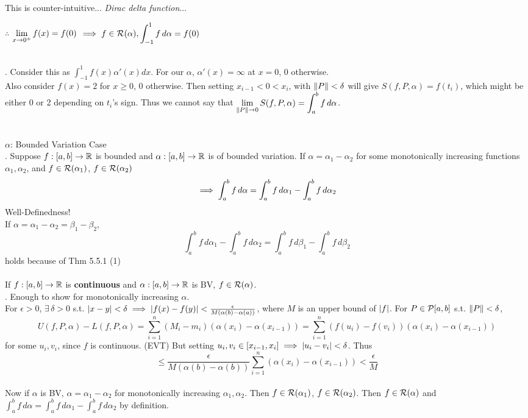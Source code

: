 This is counter-intuitive... \textit{Dirac delta function}...
\begin{center}
	$\therefore$ $\displaystyle\lim_{x\rightarrow0^{+}} f(x) = f(0)$ $\displaystyle \implies f\in \mathcal{R}(\alpha), \int_{-1}^1 f\,d\alpha = f(0)$
\end{center}~\\
\rmk. Consider this as $\int_{-1}^1 f(x)\alpha'(x) dx$. For our $\alpha$, $\alpha'(x) = \infty$ at $x=0$, 0 otherwise.\\
Also consider $f(x) = 2$ for $x\geq 0$, 0 otherwise. Then setting $x_{i-1} < 0 < x_{i}$, with $\left\lVert P\right\rVert < \delta$ will give $S(f, P, \alpha) = f(t_i)$, which might be either 0 or 2 depending on $t_i$'s sign. Thus we cannot say that $\displaystyle \lim_{\left\lVert P\right\rVert\rightarrow0} S(f, P, \alpha) = \int_a^b f\,d\alpha$.\\
\\
\\
$\alpha$: Bounded Variation Case\\
. Suppose $f:[a, b]\rightarrow\mathbb{R}$ is bounded and $\alpha:[a, b]\rightarrow\mathbb{R}$ is of bounded variation. If $\alpha = \alpha_1-\alpha_2$ for some monotonically increasing functions $\alpha_1, \alpha_2$, and $f\in \mathcal{R}(\alpha_1)$, $f\in \mathcal{R}(\alpha_2)$
$$\implies \int_a^b f\, d\alpha = \int_a^b f\,d\alpha_1 - \int_a^b f\,d\alpha_2$$
Well-Definedness!\\
If $\alpha = \alpha_1-\alpha_2 = \beta_1-\beta_2$,
$$\int_a^b f\,d\alpha_1 - \int_a^b f\,d\alpha_2 = \int_a^b f\,d\beta_1 - \int_a^b f\,d\beta_2$$
holds because of Thm 5.5.1 (1)\\
\\
 If $f:[a, b]\rightarrow\mathbb{R}$ is \textbf{continuous} and $\alpha:[a, b]\rightarrow\mathbb{R}$ is BV, $f\in \mathcal{R}(\alpha)$.\\
\pf. Enough to show for monotonically increasing $\alpha$.\\
For $\epsilon > 0$, $\exists\,\delta>0$ s.t. $\left|x-y\right|<\delta \implies \left|f(x)-f(y)\right| <\frac{\epsilon}{M (\alpha(b)-\alpha(a))}$,
where $M$ is an upper bound of $\left|f\right|$. For $P\in \mathcal{P}[a, b]$ s.t. $\left\lVert P\right\rVert<\delta$,
$$U(f, P, \alpha) - L(f, P, \alpha) = \sum_{i=1}^n (M_i-m_i)(\alpha(x_i)-\alpha(x_{i-1})) = \sum_{i=1}^n (f(u_i)-f(v_i))(\alpha(x_i)-\alpha(x_{i-1}))$$
for some $u_i, v_i$, since $f$ is continuous. (EVT)
But setting $u_i, v_i \in [x_{i-1}, x_i] \implies \left|u_i-v_i\right| < \delta$. Thus
$$\leq \frac{\epsilon}{M(\alpha(b)-\alpha(b))}\sum_{i=1}^n (\alpha(x_i)-\alpha(x_{i-1})) < \frac{\epsilon}{M}$$\\
Now if $\alpha$ is BV, $\alpha = \alpha_1-\alpha_2$ for monotonically increasing $\alpha_1, \alpha_2$.
Then $f\in \mathcal{R}(\alpha_1)$, $f\in \mathcal{R}(\alpha_2)$. Then $f\in \mathcal{R}(\alpha)$ and $\int_a^b f\, d\alpha = \int_a^b f\,d\alpha_1 - \int_a^b f\,d\alpha_2$ by definition.
\pagebreak